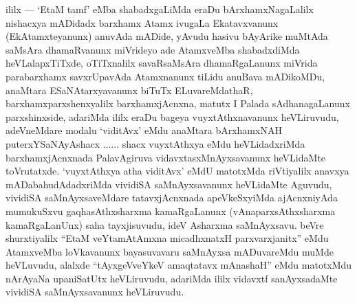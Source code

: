 \begin{artha}
ililx --- `EtaM tamf' eMba shabadxgaLiMda eraDu bArxhamxNagaLalilx nishacxya mADidadx barxhamx Atamx ivugaLa Ekatavxvanunx (EkAtamxteyanunx) anuvAda mADide, yAvudu hasivu bAyArike muMtAda saMsAra dhamaRvanunx miVrideyo ade AtamxveMba shabadxdiMda heVLalapxTiTxde, oTiTxnalilx savaRsaMsAra dhamaRgaLanunx miVrida parabarxhamx savxrUpavAda Atamxnanunx tiLidu anuBava mADikoMDu, anaMtara ESaNAtarxyavanunx biTuTx ELuvareMdathaR, barxhamxparxshenxyalilx barxhamxjAcnxna, matutx I Palada sAdhanagaLanunx parxshinxside, adariMda ililx eraDu bageya vuyxtAthxnavanunx heVLiruvudu, adeVneMdare modalu `viditAvx' eMdu anaMtara bArxhamxNAH puterxYSaNAyAshacx ...... shacx vuyxtAthxya eMdu heVLidadxriMda barxhamxjAcnxnada PalavAgiruva vidavxtasxMnAyxsavanunx heVLidaMte toVrutatxde. `vuyxtAthxya atha viditAvx' eMdU matotxMda riVtiyalilx anavxya mADabahudAdadxriMda vividiSA saMnAyxsavanunx heVLidaMte Aguvudu, vividiSA saMnAyxsaveMdare tatavxjAcnxnada apeVkeSxyiMda ajAcnxniyAda mumukuSxvu gaqhasAthxsharxma kamaRgaLanunx (vAnaparxsAthxsharxma kamaRgaLanUnx) saha tayxjisuvudu, ideV Asharxma saMnAyxsavu. beVre shurxtiyalilx ``EtaM veYtamAtAmxna micadhxnatxH parxvarxjanitx'' eMdu AtamxveMba loVkavanunx bayasuvavaru saMnAyxsa mADuvareMdu muMde heVLuvudu, alalxde ``tAyxgeVveYkeV amaqtatavx mAnashaH'' eMdu matotxMdu nArAyaNa upaniSatUtx heVLiruvudu, adariMda ililx vidavxtf sanAyxsadaMte vividiSA saMnAyxsavanunx heVLiruvudu.
\end{artha}

